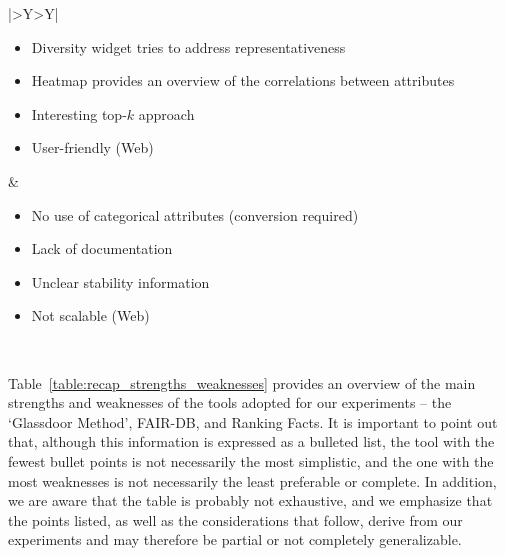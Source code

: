 \begin{table}[t!]
\begin{tabularx}{\columnwidth}{|>{\RaggedRight\arraybackslash}Y>{\RaggedRight\arraybackslash}Y|}
\begin{itemize}[noitemsep,topsep=0pt,parsep=0pt,partopsep=0pt,leftmargin=*]
\item Diversity widget tries to address representativeness
\item Heatmap provides an overview of the correlations between attributes
\item Interesting top-\(k\) approach
\item User-friendly (Web)
\end{itemize} & \begin{itemize}[noitemsep,topsep=0pt,parsep=0pt,partopsep=0pt,leftmargin=*]
\item No use of categorical attributes (conversion required)
\item Lack of documentation\vspace{2\baselineskip}
\item Unclear stability information
\item Not scalable (Web)
\end{itemize}\\
\hline
\end{tabularx}
\centering
\caption{Recap of the strengths and weaknesses of the tools used for the experiments.}
\label{table:recap_strengths_weaknesses}
\end{table}

Table~\ref{table:recap_strengths_weaknesses} provides an overview of the main strengths and weaknesses of the tools adopted for our experiments -- the `Glassdoor Method', FAIR-DB, and Ranking Facts. It is important to point out that, although this information is expressed as a bulleted list, the tool with the fewest bullet points is not necessarily the most simplistic, and the one with the most weaknesses is not necessarily the least preferable or complete. In addition, we are aware that the table is probably not exhaustive, and we emphasize that the points listed, as well as the considerations that follow, derive from our experiments and may therefore be partial or not completely generalizable.

